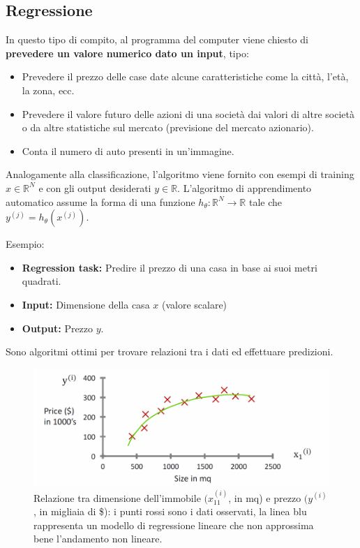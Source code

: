 \subsection{Regressione}

In questo tipo di compito, al programma del computer viene chiesto di \textbf{prevedere un valore numerico dato un input}, tipo:
\begin{itemize}
    \item Prevedere il prezzo delle case date alcune caratteristiche come la città, l'età, la zona, ecc.
    \item Prevedere il valore futuro delle azioni di una società dai valori di altre società o da altre statistiche sul mercato (previsione del mercato azionario).
    \item Conta il numero di auto presenti in un'immagine.
\end{itemize}

\noindent
Analogamente alla classificazione, l'algoritmo viene fornito con esempi di training $x \in \mathbb{R}^{N}$ e con gli output desiderati $y \in \mathbb{R}$. L'algoritmo di apprendimento automatico assume la forma di una funzione $ h_\theta: \mathbb{R}^{N} \rightarrow \mathbb{R}$ tale che $y^{(j)} = h_\theta(x^{(j)})$.

\noindent
Esempio:

\begin{itemize}
    \item \textbf{Regression task:} Predire il prezzo di una casa in base ai suoi metri quadrati.
    \item \textbf{Input:} Dimensione della casa $x$ (valore scalare)
    \item \textbf{Output:} Prezzo $y$.
\end{itemize}

\noindent
Sono algoritmi ottimi per trovare relazioni tra i dati ed effettuare predizioni.

\begin{figure}[htp]
    \centering
    \includegraphics[width=\textwidth]{images/regression.png}
    \caption{Relazione tra dimensione dell’immobile $(x_11^{(i)}$, in mq) e prezzo $(y^{(i)}$, in migliaia di \$): i punti rossi sono i dati osservati, la linea blu rappresenta un modello di regressione lineare che non approssima bene l’andamento non lineare.}
    \label{fig:regressione}
\end{figure}

